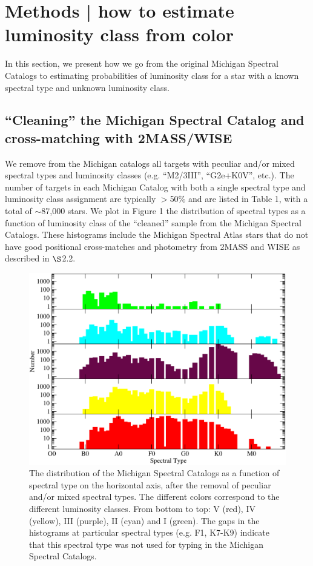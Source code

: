 \chapter{Methods | how to estimate luminosity class from color} \label{chap:METHODS}

In this section, we present how we go from the original Michigan Spectral Catalogs to estimating probabilities of luminosity class for a star with a known spectral type and unknown luminosity class.

\section{``Cleaning'' the Michigan Spectral Catalog and cross-matching with 2MASS/WISE} \label{sec:clean_michigan}

We remove from the Michigan catalogs all targets with peculiar and/or mixed spectral types and luminosity classes (e.g. ``M2/3III'', ``G2e+K0V'', etc.).  The  number of targets in each Michigan Catalog with both a single spectral type and luminosity class assignment are typically $>$50\% and are listed in Table 1, with a total of $\sim$87,000 stars. We plot in Figure 1 the distribution of spectral types as a function of luminosity class of the ``cleaned'' sample from the Michigan Spectral Catalogs.  These histograms include the Michigan Spectral Atlas stars that do not have good positional cross-matches and photometry from 2MASS and WISE as described in ${\S}$2.2.

\begin{figure}[t]
    \begin{center}
        \includegraphics[width=1.0\textwidth]{Figures/populations/hist-spt-count.pdf}
    \end{center}
\caption{The distribution of the Michigan Spectral Catalogs as a function of spectral type on the horizontal axis, after the removal of peculiar and/or mixed spectral types.  The different colors correspond to the different luminosity classes.  From bottom to top: V (red), IV (yellow), III (purple), II (cyan) and I (green).  The gaps in the histograms at particular spectral types (e.g. F1, K7-K9) indicate that this spectral type was not used for typing in the Michigan Spectral Catalogs.}
\end{figure}

